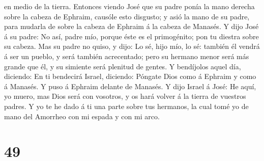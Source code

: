 en medio de la tierra.  Entonces viendo José que su padre
ponía la mano derecha sobre la cabeza de Ephraim, causóle esto disgusto;
y asió la mano de su padre, para mudarla de sobre la cabeza de Ephraim á
la cabeza de Manasés.  Y dijo José á su padre: No así,
padre mío, porque éste es el primogénito; pon tu diestra sobre su
cabeza.  Mas su padre no quiso, y dijo: Lo sé, hijo mío,
lo sé: también él vendrá á ser un pueblo, y será también acrecentado;
pero su hermano menor será más grande que él, y su simiente será
plenitud de gentes.  Y bendíjolos aquel día, diciendo: En
ti bendecirá Israel, diciendo: Póngate Dios como á Ephraim y como á
Manasés. Y puso á Ephraim delante de Manasés.  Y dijo
Israel á José: He aquí, yo muero, mas Dios será con vosotros, y os hará
volver á la tierra de vuestros padres.  Y yo te he dado á
ti una parte sobre tus hermanos, la cual tomé yo de mano del Amorrheo
con mi espada y con mi arco.

\hypertarget{section-48}{%
\section{49}\label{section-48}}

